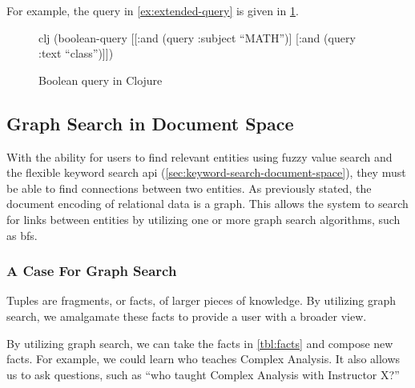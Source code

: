 			\begin{ex}
				For example, the query in \cref{ex:extended-query} is given in \cref{clj:boolean-query}.
				
				\begin{figure}
					\begin{singlespaced}
						\begin{pygments}{clj}
(boolean-query
 [[:and (query :subject ``MATH'')]
  [:and (query :text ``class'')]])
						\end{pygments}
					\end{singlespaced}
					
					\caption{Boolean query in Clojure}
					\label{clj:boolean-query}
				\end{figure}
			\end{ex}

	\subsection{Graph Search in Document Space}
		With the ability for users to find relevant entities using fuzzy value search and the flexible keyword search \gls{api} (\cref{sec:keyword-search-document-space}), they must be able to find connections between two entities.  As previously stated, the document encoding of relational data is a graph.  This allows the system to search for links between entities by utilizing one or more graph search algorithms, such as \gls{bfs}.
		
		\subsubsection{A Case For Graph Search}
			Tuples are fragments, or facts, of larger pieces of knowledge.  By utilizing graph search, we amalgamate these facts to provide a user with a broader view.
			
				By utilizing graph search, we can take the facts in \cref{tbl:facts} and compose new facts.  For example, we could learn who teaches Complex Analysis.  It also allows us to ask questions, such as ``who taught Complex Analysis with Instructor X?''
			
